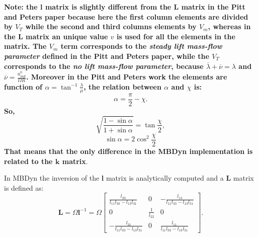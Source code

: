 \textbf{Note: the $\mathbf{l}$ matrix is slightly different from the $\mathbf{L}$
matrix in the Pitt and Peters paper \cite{PITT} because here the
first column elements are divided by $V_T$ while the second and
third columns elements by $V_m$, whereas in the $\mathbf{L}$ matrix
an unique value $v$ is used for all the elements in the matrix.
The $V_m$ term corresponds to the \emph{steady lift mass-flow parameter}
defined in the Pitt and Peters paper, while the $V_T$ corresponds to
the \emph{no lift mass-flow parameter}, because 
$\overline{\lambda} + \overline{\nu} = \lambda$ and 
$\overline{\nu} = \frac{u_{ind}^{0}}{\Omega R}$.
Moreover in the Pitt and Peters work the elements are function of
$\alpha = \tan^{-1}{\frac{\lambda}{\mu}}$, the relation between $\alpha$ and
$\chi$ is:
\begin{equation}
\alpha = \frac{\pi}{2} - \chi.
\end{equation}
So,
\begin{equation}
\sqrt{\frac{1-\sin{\alpha}}{1+\sin{\alpha}}} = \tan{\frac{\chi}{2}},
\end{equation}
\begin{equation}
\sin{\alpha} = 2 \cos^{2} {\frac{\chi}{2}}
\end{equation}
That means that the only difference in the MBDyn implementation is
related to the $\mathbf{k}$ matrix}.

In MBDyn the inversion of the $\mathbf{l}$ matrix is analytically computed
and a $\mathbf{L}$ matrix is defined as:
\begin{equation}
\mathbf{L} = \Omega \mathbf{l}^{-1} = \Omega \left[
\begin{array}{ccc}
\frac{l_{33}}{l_{11}l_{33}-l_{13}l_{31}} & 0 & -\frac{l_{13}}{l_{11}l_{33}-l_{13}l_{31}} \\
0 & \frac{1}{l_{22}} & 0 \\
-\frac{l_{31}}{l_{11}l_{33}-l_{13}l_{31}} & 0 & \frac{l_{11}}{l_{11}l_{33}-l_{13}l_{31}}
\end{array}
\right].
\end{equation}

%

